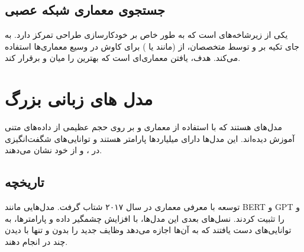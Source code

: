 \subsection{جستجوی معماری شبکه عصبی}
 یکی از زیرشاخه‌های  است که به طور خاص بر خودکارسازی طراحی   تمرکز دارد. به جای تکیه بر  و  توسط متخصصان،  از  (مانند  یا ) برای کاوش در  وسیع معماری‌ها استفاده می‌کند. هدف، یافتن معماری‌ای است که بهترین  را میان  و  برقرار کند.

\section{مدل های زبانی بزرگ}
 مدل‌های  هستند که با استفاده از معماری  و بر روی حجم عظیمی از داده‌های متنی آموزش دیده‌اند. این مدل‌ها دارای میلیاردها پارامتر هستند و توانایی‌های شگفت‌انگیزی در ،  و  از خود نشان می‌دهند.

\subsection{تاریخچه}
توسعه  با معرفی معماری  در سال ۲۰۱۷ شتاب گرفت. مدل‌هایی مانند BERT و GPT   و  را تثبیت کردند. نسل‌های بعدی این مدل‌ها، با افزایش چشمگیر  داده و پارامترها، به توانایی‌های  دست یافتند که به آن‌ها اجازه می‌دهد وظایف جدید را بدون  و تنها با دیدن چند  در  انجام دهند.

